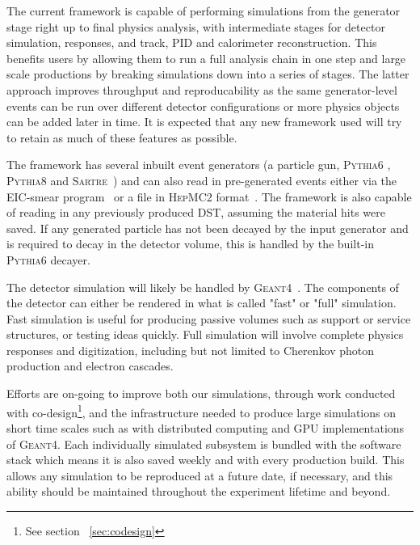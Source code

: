 	The current framework is capable of performing simulations from the generator stage right up to final physics analysis, with intermediate stages for detector simulation, responses, and track, PID and calorimeter reconstruction. This benefits users by allowing them to run a full analysis chain in one step and large scale productions by breaking simulations down into a series of stages. The latter approach improves throughput and reproducability as the same generator-level events can be run over different detector configurations or more physics objects can be added later in time. It is expected that any new framework used will try to retain as much of these features as possible.
	
	The framework has several inbuilt event generators (a particle gun, \textsc{Pythia6} \cite{Sjostrand:2000wi}, \textsc{Pythia8} \cite{sjostrand2008brief} and \textsc{Sartre}~\cite{toll2014dipole}) and can also read in pre-generated events either via the EIC-smear program~\cite{eicsmear} or a file in \textsc{HepMC2} format~\cite{dobbs2001hepmc}. The framework is also capable of reading in any previously produced DST, assuming the material hits were saved. If any generated particle has not been decayed by the input generator and is required to decay in the detector volume, this is handled by the built-in \textsc{Pythia6} decayer. 
	
	The detector simulation will likely be handled by \textsc{Geant4}~\cite{Agostinelli:2002hh}. The components of the detector can either be rendered in what is called "fast" or "full" simulation. Fast simulation is useful for producing passive volumes such as support or service structures, or testing ideas quickly. Full simulation will involve complete physics responses and digitization, including but not limited to Cherenkov photon production and electron cascades. 
	
	Efforts are on-going to improve both our simulations, through work conducted with co-design\footnote{See section ~\ref{sec:codesign}}, and the infrastructure needed to produce large simulations on short time scales such as with distributed computing and GPU implementations of \textsc{Geant4}. Each individually simulated subsystem is bundled with the software stack which means it is also saved weekly and with every production build. This allows any simulation to be reproduced at a future date, if necessary, and this ability should be maintained throughout the experiment lifetime and beyond. 
	
